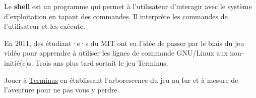 \pagebreak

\begin{easybox}[Le shell]{}
    Le \textbf{shell} est un programme qui permet à l'utilisateur d'interagir avec le système d'exploitation en tapant des commandes. Il interprète les commandes de l'utilisateur et les exécute.  
\end{easybox}

\begin{exercice_cours}{}
    En 2011, des étudiant·e·s du MIT ont eu l'idée de passer par le biais du jeu vidéo pour apprendre à utiliser les lignes de commande GNU/Linux aux non‐initié(e)s. Trois ans plus tard sortait le jeu Terminus.

    Jouer à \href{https://luffah.xyz/bidules/Terminus/}{Terminus} en établissant l'arborescence du jeu au fur et à mesure de l'aventure pour ne pas vous y perdre.
\end{exercice_cours}

\medskip

